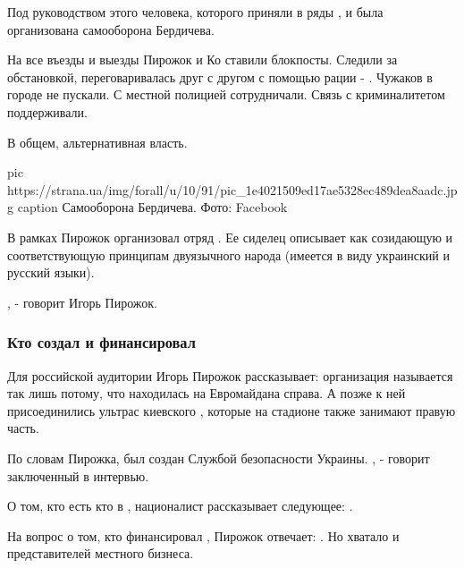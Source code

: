 Под руководством этого человека, которого приняли в ряды , и была организована самооборона Бердичева.

На все въезды и выезды Пирожок и Ко ставили блокпосты. Следили за
обстановкой, переговаривалась друг с другом с помощью рации - . Чужаков в городе не
пускали. С местной полицией сотрудничали. Связь с криминалитетом
поддерживали. 

В общем, альтернативная власть. 

\ifcmt
pic https://strana.ua/img/forall/u/10/91/pic_1e4021509ed17ae5328ec489dea8aadc.jpg
caption Самооборона Бердичева. Фото: Facebook
\fi

В рамках  Пирожок организовал отряд . Ее сиделец
описывает как созидающую и соответствующую принципам двуязычного народа
(имеется в виду украинский и русский языки). 

, - говорит Игорь Пирожок. 

\subsubsection{Кто создал и финансировал }

Для российской аудитории Игорь Пирожок рассказывает: организация  называется так лишь потому, что находилась на Евромайдана справа.
А позже к ней присоединились ультрас киевского , которые на
стадионе также занимают правую часть. 

По словам Пирожка,  был создан Службой безопасности
Украины. , - говорит заключенный в интервью. 

О том, кто есть кто в , националист рассказывает
следующее: . 

На вопрос о том, кто финансировал , Пирожок
отвечает: . Но хватало и представителей
местного бизнеса.

